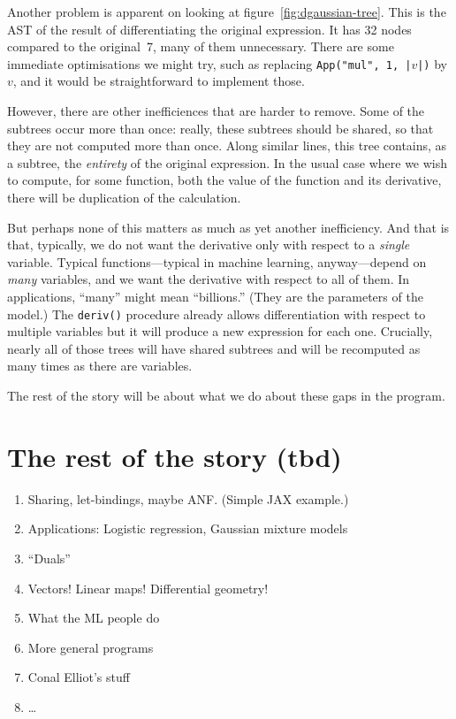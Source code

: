 \documentclass[11pt, a4paper]{article}
\newcommand{\cd}[1]{\texttt{#1}}
\begin{document}
Another problem is apparent on looking at
figure~\ref{fig:dgaussian-tree}. This is the AST of the result of
differentiating the original expression. It has 32 nodes compared to
the original~7, many of them unnecessary. There are some immediate
optimisations we might try, such as replacing \cd{App("mul", 1,
  |$v$|)} by $v$, and it would be straightforward to implement those.

However, there are other inefficiences that are harder to remove. Some
of the subtrees occur more than once: really, these subtrees should be
shared, so that they are not computed more than once. Along similar
lines, this tree contains, as a subtree, the \emph{entirety} of the
original expression. In the usual case where we wish to compute, for
some function, both the value of the function and its derivative,
there will be duplication of the calculation.

But perhaps none of this matters as much as yet another
inefficiency. And that is that, typically, we do not want the
derivative only with respect to a \emph{single} variable. Typical
functions---typical in machine learning, anyway---depend on \emph{many}
variables, and we want the derivative with respect to all of them. In
applications, ``many'' might mean ``billions.'' (They are the
parameters of the model.) The \cd{deriv()} procedure already allows
differentiation with respect to multiple variables but it will produce
a new expression for each one. Crucially, nearly all of those trees
will have shared subtrees and will be recomputed as many times as
there are variables.

The rest of the story will be about what we do about these gaps in the
program.

\section{The rest of the story (tbd)}

\begin{enumerate}
\item Sharing, let-bindings, maybe ANF. (Simple JAX example.)
\item Applications: Logistic regression, Gaussian mixture models
\item ``Duals''
\item Vectors! Linear maps! Differential geometry!
\item What the ML people do 
\item More general programs
\item Conal Elliot's stuff
\item \dots
\end{enumerate}
\end{document}
